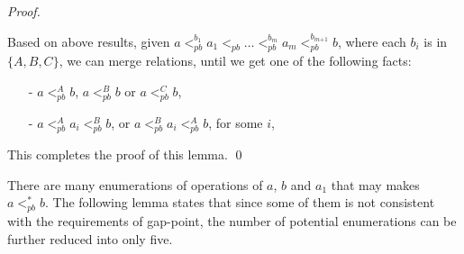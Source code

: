 \begin {proof}
\begin{itemize}
\end{itemize}

Based on above results, given $a <_{\textit{pb}}^{b_1} a_1 <_{\textit{pb}} \ldots <_{\textit{pb}}^{b_m} a_m <_{\textit{pb}}^{b_{\textit{m+1}}} b$, where each $b_i$ is in $\{ A,B,C \}$, we can merge relations, until we get one of the following facts:

\begin{itemize}
\setlength{\itemsep}{0.5pt}
\item[-] $a <_{\textit{pb}}^A b$, $a <_{\textit{pb}}^B b$ or $a <_{\textit{pb}}^C b$,

\item[-] $a <_{\textit{pb}}^A a_i <_{\textit{pb}}^B b$, or $a <_{\textit{pb}}^B a_i <_{\textit{pb}}^A b$, for some $i$,
\end{itemize}

This completes the proof of this lemma. \qed
\end {proof}

There are many enumerations of operations of $a$, $b$ and $a_1$ that may makes $a <_{\textit{pb}}^* b$. The following lemma states that since some of them is not consistent with the requirements of gap-point, the number of potential enumerations can be further reduced into only five. 


